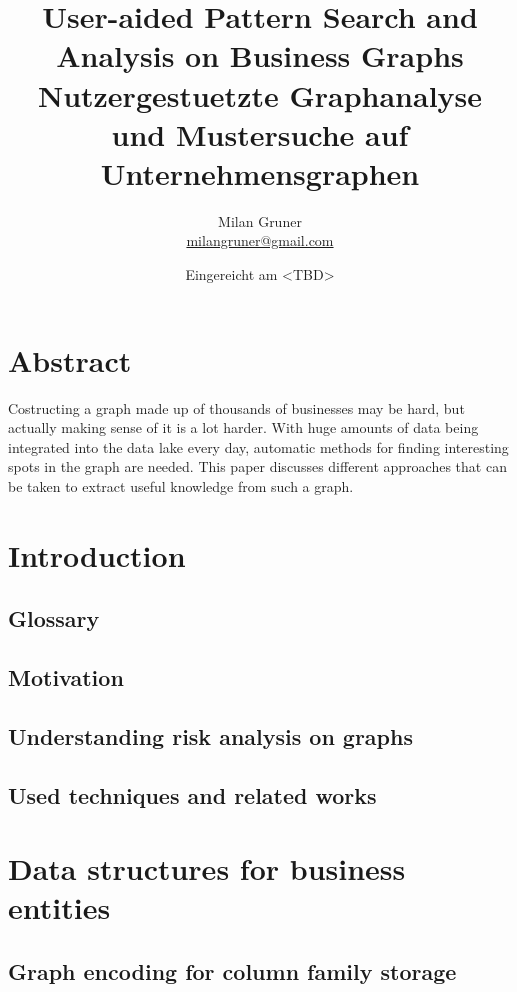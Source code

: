 \documentclass[
        a4paper,     %
        titlepage,   %
        twoside,     %
        parskip      %
        ]{scrartcl}  %
\title{User-aided Pattern Search and Analysis on Business Graphs
\\ \bigskip
\large{Nutzergestuetzte Graphanalyse und Mustersuche auf Unternehmensgraphen}}
\author{Milan Gruner\\{\small{\url{milangruner@gmail.com}}}}
\date{Eingereicht am <TBD>}
\begin{document}
  \maketitle    %
  \clearpage %

  \section*{Abstract}
  Costructing a graph made up of thousands of businesses may be hard, but actually making sense of it is a lot harder.
  With huge amounts of data being integrated into the data lake every day, automatic methods for finding interesting spots in the graph are needed.
  This paper discusses different approaches that can be taken to extract useful knowledge from such a graph.

  \clearpage
  \tableofcontents


  \section{Introduction}
    \subsection{Glossary}
    \subsection{Motivation}
    \subsection{Understanding risk analysis on graphs}
    \subsection{Used techniques and related works}
  \section{Data structures for business entities}
    \subsection{Graph encoding for column family storage}
\end{document}
